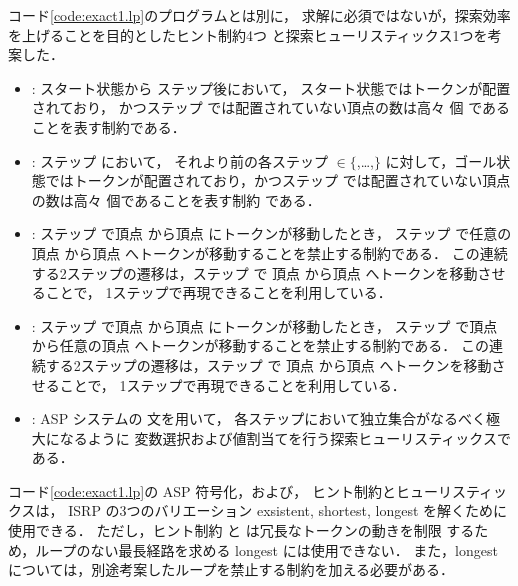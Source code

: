 コード\ref{code:exact1.lp}のプログラムとは別に，
求解に必須ではないが，探索効率を上げることを目的としたヒント制約4つ
と探索ヒューリスティックス1つを考案した．
\begin{itemize}
\item {}:
  スタート状態から  ステップ後において，
  スタート状態ではトークンが配置されており，
  かつステップ  では配置されていない頂点の数は高々  個
  であることを表す制約である．
\item {}:
  ステップ  において，
  それより前の各ステップ  $\in\{$,\ldots,$\}$
  に対して，ゴール状態ではトークンが配置されており，かつステップ 
  では配置されていない頂点の数は高々  個であることを表す制約
  である．
\item {}:
  ステップ  で頂点  から頂点 
  にトークンが移動したとき，
  ステップ  で任意の頂点  から頂点 
  へトークンが移動することを禁止する制約である．
  この連続する2ステップの遷移は，ステップ  で
  頂点  から頂点  へトークンを移動させることで，
  1ステップで再現できることを利用している．
\item {}:
  ステップ  で頂点  から頂点 
  にトークンが移動したとき，
  ステップ  で頂点  から任意の頂点 
  へトークンが移動することを禁止する制約である．
  この連続する2ステップの遷移は，ステップ  で
  頂点  から頂点  へトークンを移動させることで，
  1ステップで再現できることを利用している．
\item {}:
  ASP システム{\clingo}の  文を用いて，
  各ステップにおいて独立集合がなるべく極大になるように
  変数選択および値割当てを行う探索ヒューリスティックスである．
\end{itemize}

コード\ref{code:exact1.lp}の ASP 符号化，および，
ヒント制約とヒューリスティックスは，
ISRP の3つのバリエーション exsistent, shortest, longest
を解くために使用できる．
ただし，ヒント制約  と  は冗長なトークンの動きを制限
するため，ループのない最長経路を求める longest には使用できない．
また，longest については，別途考案したループを禁止する制約を加える必要がある．

